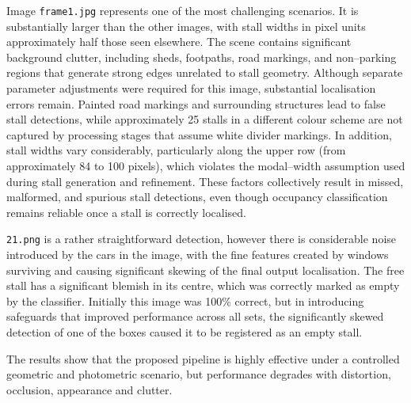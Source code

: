 \documentclass[9pt,journal]{IEEEtran}
\begin{document}
	Image \texttt{frame1.jpg} represents one of the most challenging scenarios. It is substantially larger than the other images, with stall widths in pixel units approximately half those seen elsewhere. The scene contains significant background clutter, including sheds, footpaths, road markings, and non--parking regions that generate strong edges unrelated to stall geometry. Although separate parameter adjustments were required for this image, substantial localisation errors remain. Painted road markings and surrounding structures lead to false stall detections, while approximately 25 stalls in a different colour scheme are not captured by processing stages that assume white divider markings. In addition, stall widths vary considerably, particularly along the upper row (from approximately 84 to 100 pixels), which violates the modal--width assumption used during stall generation and refinement. These factors collectively result in missed, malformed, and spurious stall detections, even though occupancy classification remains reliable once a stall is correctly localised.
	
	\texttt{21.png} is a rather straightforward detection, however there is considerable noise introduced by the cars in the image, with the fine features created by windows surviving and causing significant skewing of the final output localisation. The free stall has a significant blemish in its centre, which was correctly marked as empty by the classifier. Initially this image was 100\% correct, but in introducing safeguards that improved performance across all sets, the significantly skewed detection of one of the boxes caused it to be registered as an empty stall.
	
	The results show that the proposed pipeline is highly effective under a controlled geometric and photometric scenario, but performance degrades with distortion, occlusion, appearance and clutter. 
	
\end{document}
